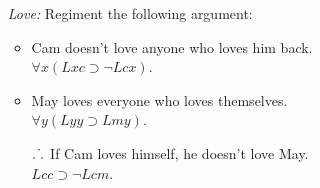 \documentclass[a4paper, 11pt]{article} %
\newcommand{\tuple}[1]{\langle#1\rangle} %
\def\therefore{\ensuremath{\ldotp\dot\,\ldotp}}
\newcommand{\I}{\mathcal{I}}
\newcommand{\M}{\mathcal{M}}
\newcommand{\D}{\mathbb{D}}
\newcommand{\VV}[2]{\mathcal{V}_{#1}^{#2}} %
\begin{document}
\begin{enumerate}
  \item[\it Love:] Regiment the following argument:
    \begin{itemize}
      \item Cam doesn't love anyone who loves him back.\\
        $\forall x(Lxc \supset \neg Lcx)$.
      \item May loves everyone who loves themselves.\\
        $\forall y(Lyy \supset Lmy)$.
      \item[\therefore] If Cam loves himself, he doesn't love May.\\
        $Lcc \supset \neg Lcm$.
    \end{itemize}

\end{enumerate}
\end{document}
